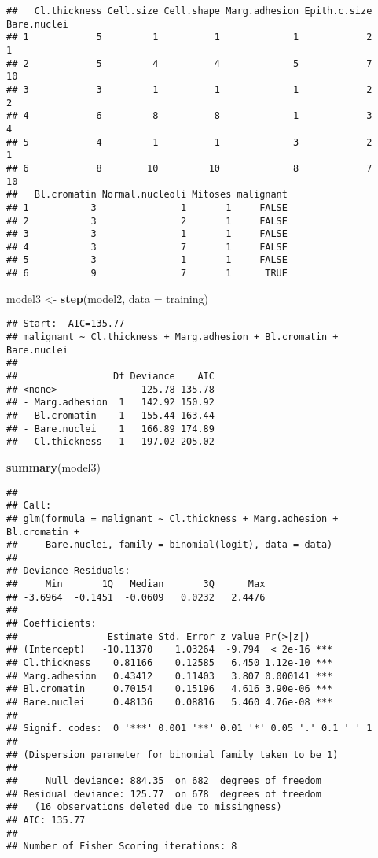 \documentclass[
]{article}
\newenvironment{Shaded}{\begin{snugshade}}{\end{snugshade}}
\newcommand{\DataTypeTok}[1]{\textcolor[rgb]{0.13,0.29,0.53}{#1}}
\newcommand{\KeywordTok}[1]{\textcolor[rgb]{0.13,0.29,0.53}{\textbf{#1}}}
\newcommand{\NormalTok}[1]{#1}
\newcommand{\StringTok}[1]{\textcolor[rgb]{0.31,0.60,0.02}{#1}}
\begin{document}
\begin{verbatim}
##   Cl.thickness Cell.size Cell.shape Marg.adhesion Epith.c.size Bare.nuclei
## 1            5         1          1             1            2           1
## 2            5         4          4             5            7          10
## 3            3         1          1             1            2           2
## 4            6         8          8             1            3           4
## 5            4         1          1             3            2           1
## 6            8        10         10             8            7          10
##   Bl.cromatin Normal.nucleoli Mitoses malignant
## 1           3               1       1     FALSE
## 2           3               2       1     FALSE
## 3           3               1       1     FALSE
## 4           3               7       1     FALSE
## 5           3               1       1     FALSE
## 6           9               7       1      TRUE
\end{verbatim}

\begin{Shaded}
\begin{Highlighting}[]
\NormalTok{model3 <-}\StringTok{ }\KeywordTok{step}\NormalTok{(model2, }\DataTypeTok{data =}\NormalTok{ training)}
\end{Highlighting}
\end{Shaded}

\begin{verbatim}
## Start:  AIC=135.77
## malignant ~ Cl.thickness + Marg.adhesion + Bl.cromatin + Bare.nuclei
## 
##                 Df Deviance    AIC
## <none>               125.78 135.78
## - Marg.adhesion  1   142.92 150.92
## - Bl.cromatin    1   155.44 163.44
## - Bare.nuclei    1   166.89 174.89
## - Cl.thickness   1   197.02 205.02
\end{verbatim}

\begin{Shaded}
\begin{Highlighting}[]
\KeywordTok{summary}\NormalTok{(model3)}
\end{Highlighting}
\end{Shaded}

\begin{verbatim}
## 
## Call:
## glm(formula = malignant ~ Cl.thickness + Marg.adhesion + Bl.cromatin + 
##     Bare.nuclei, family = binomial(logit), data = data)
## 
## Deviance Residuals: 
##     Min       1Q   Median       3Q      Max  
## -3.6964  -0.1451  -0.0609   0.0232   2.4476  
## 
## Coefficients:
##                Estimate Std. Error z value Pr(>|z|)    
## (Intercept)   -10.11370    1.03264  -9.794  < 2e-16 ***
## Cl.thickness    0.81166    0.12585   6.450 1.12e-10 ***
## Marg.adhesion   0.43412    0.11403   3.807 0.000141 ***
## Bl.cromatin     0.70154    0.15196   4.616 3.90e-06 ***
## Bare.nuclei     0.48136    0.08816   5.460 4.76e-08 ***
## ---
## Signif. codes:  0 '***' 0.001 '**' 0.01 '*' 0.05 '.' 0.1 ' ' 1
## 
## (Dispersion parameter for binomial family taken to be 1)
## 
##     Null deviance: 884.35  on 682  degrees of freedom
## Residual deviance: 125.77  on 678  degrees of freedom
##   (16 observations deleted due to missingness)
## AIC: 135.77
## 
## Number of Fisher Scoring iterations: 8
\end{verbatim}
\end{document}
